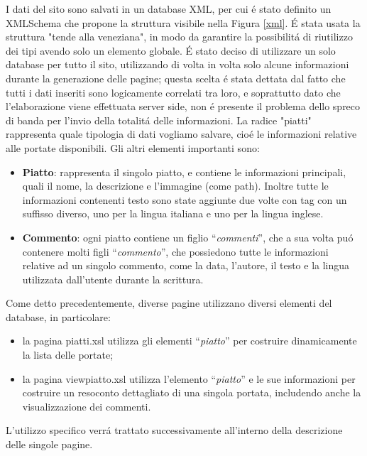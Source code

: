 \documentclass[10pt,a4paper,onecolumn]{article}
\begin{document}
I dati del sito sono salvati in un database XML, per cui \'e stato definito un XMLSchema che propone la struttura visibile nella Figura \ref{xml}. \'E stata usata la struttura "tende alla veneziana", in modo da garantire la possibilit\'a di riutilizzo dei tipi avendo solo un elemento globale. 
\'E stato deciso di utilizzare un solo database per tutto il sito, utilizzando di volta in volta solo alcune informazioni durante la generazione delle pagine; questa scelta \'e stata dettata dal fatto che tutti i dati inseriti sono logicamente correlati tra loro, e soprattutto dato che l'elaborazione viene effettuata server side, non \'e presente il problema dello spreco di banda per l'invio della totalit\'a delle informazioni.
La radice "piatti" rappresenta quale tipologia di dati vogliamo salvare, cio\'e le informazioni relative alle portate disponibili.
Gli altri elementi importanti sono:
\begin{itemize}
 \item \textbf{Piatto}: rappresenta il singolo piatto, e contiene le informazioni principali, quali il nome, la descrizione e l'immagine (come path). Inoltre tutte le informazioni contenenti testo sono state aggiunte due volte con tag con un suffisso diverso, uno per la lingua italiana e uno per la lingua inglese.
 \item \textbf{Commento}: ogni piatto contiene un figlio ``\textit{commenti}'', che a sua volta pu\'o contenere molti figli ``\textit{commento}'', che possiedono tutte le informazioni relative ad un singolo commento, come la data, l'autore, il testo e la lingua utilizzata dall'utente durante la scrittura.
\end{itemize}
Come detto precedentemente, diverse pagine utilizzano diversi elementi del database, in particolare:
\begin{itemize}
 \item la pagina piatti.xsl utilizza gli elementi ``\textit{piatto}'' per costruire dinamicamente la lista delle portate;
 \item la pagina viewpiatto.xsl utilizza l'elemento ``\textit{piatto}'' e le sue informazioni per costruire un resoconto dettagliato di una singola portata, includendo anche la visualizzazione dei commenti.
\end{itemize}
L'utilizzo specifico verr\'a trattato successivamente all'interno della descrizione delle singole pagine.
\end{document}
